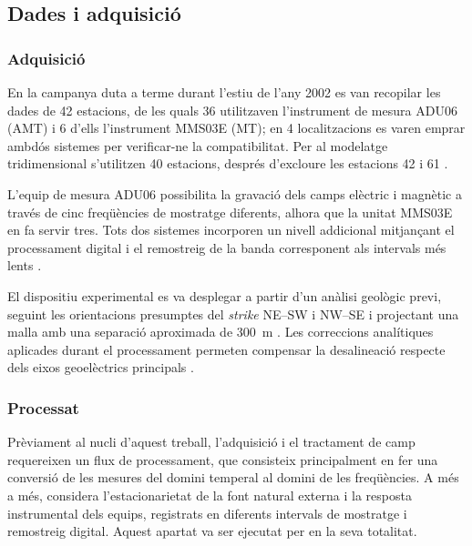 \documentclass[11pt,a4paper,oneside]{article}
\begin{document}
\subsection{Dades i adquisició}

\subsubsection{Adquisició}

En la campanya duta a terme durant l'estiu de l'any 2002 es van recopilar les dades de 42 estacions, de les quals 36 utilitzaven l'instrument de mesura ADU06 (AMT) i 6 d'ells l'instrument MMS03E (MT); en 4 localitzacions es varen emprar ambdós sistemes per verificar-ne la compatibilitat. Per al modelatge tridimensional s'utilitzen 40 estacions, després d'excloure les estacions 42 i 61 \citep{arango2005}.

\vspace{5pt}

L'equip de mesura ADU06 possibilita la gravació dels camps elèctric i magnètic a través de cinc freqüències de mostratge diferents, alhora que la unitat MMS03E en fa servir tres. Tots dos sistemes incorporen un nivell addicional mitjançant el processament digital i el remostreig de la banda corresponent als intervals més lents \citep{arango2005}. 

\vspace{5pt}

El dispositiu experimental es va desplegar a partir d’un anàlisi geològic previ, seguint les orientacions presumptes del \emph{strike} NE--SW i NW--SE i projectant una malla amb una separació aproximada de 300~m \citep{arango2005}. Les correccions analítiques aplicades durant el processament permeten compensar la desalineació respecte dels eixos geoelèctrics principals \citep{marti2004,arango2005}.

\subsubsection{Processat}

Prèviament al nucli d'aquest treball, l'adquisició i el tractament de camp requereixen un flux de processament, que consisteix principalment en fer una conversió de les mesures del domini temperal al domini de les freqüències. A més a més,  considera l'estacionarietat de la font natural externa i la resposta instrumental dels equips, registrats en diferents intervals de mostratge i remostreig digital. Aquest apartat va ser ejecutat per \citet{arango2005} en la seva totalitat.
\end{document}
